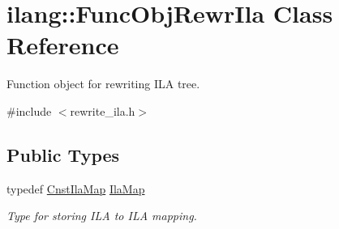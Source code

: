 \hypertarget{classilang_1_1_func_obj_rewr_ila}{}\section{ilang\+:\+:Func\+Obj\+Rewr\+Ila Class Reference}
\label{classilang_1_1_func_obj_rewr_ila}


Function object for rewriting I\+LA tree.  




{\ttfamily \#include $<$rewrite\+\_\+ila.\+h$>$}

\subsection*{Public Types}
\begin{DoxyCompactItemize}
\item 
\mbox{\label{classilang_1_1_func_obj_rewr_ila_acaa3c9d9277c11b7d0adae053dc86757}} 
typedef \mbox{\hyperlink{namespaceilang_a4e780d7b16cb21d2c10f955c504e7356}{Cnst\+Ila\+Map}} \mbox{\hyperlink{classilang_1_1_func_obj_rewr_ila_acaa3c9d9277c11b7d0adae053dc86757}{Ila\+Map}}
\begin{DoxyCompactList}\small\item\em Type for storing I\+LA to I\+LA mapping. \end{DoxyCompactList}\end{DoxyCompactItemize}
